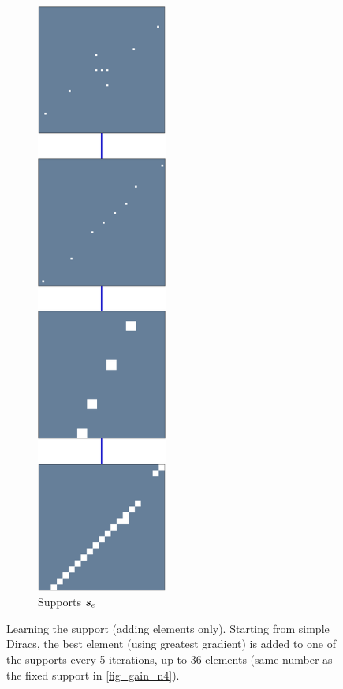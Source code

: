 \begin{figure}[!ht]
\begin{subfigure}[b]{0.3\textwidth}
\includegraphics[width=0.47\textwidth]{figures/variable_support/support.pdf}
\caption{Supports $\bm{s}_e$}
\end{subfigure}
\caption{Learning the support (adding elements only). Starting from simple Diracs, the best element (using greatest gradient) is added to one of the supports every 5 iterations, up to 36 elements (same number as the fixed support in \cref{fig_gain_n4}).} \label{fig_variable_support}
\end{figure}

